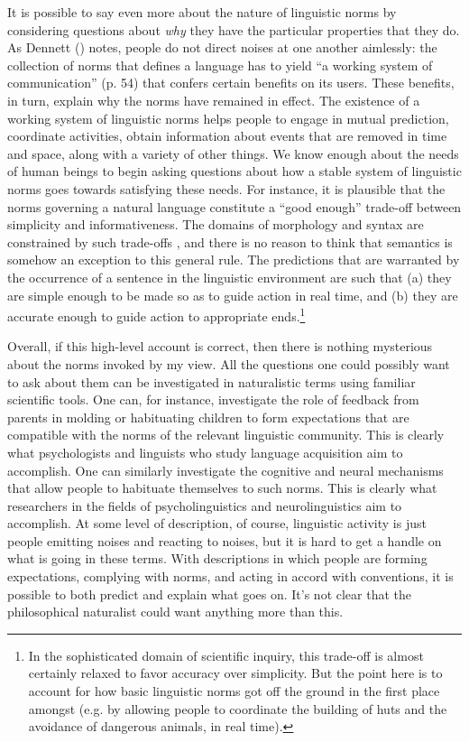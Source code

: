 It is possible to say even more about the nature of linguistic norms by considering questions about \textit{why} they have the particular properties that they do. As Dennett (\citeyear{Dennett:2010}) notes, people do not direct noises at one another aimlessly: the collection of norms that defines a language has to yield ``a working system of communication'' (p. 54) that confers certain benefits on its users. These benefits, in turn, explain why the norms have remained in effect. The existence of a working system of linguistic norms helps people to engage in mutual prediction, coordinate activities, obtain information about events that are removed in time and space, along with a variety of other things. We know enough about the needs of human beings to begin asking questions about how a stable system of linguistic norms goes towards satisfying these needs. For instance, it is plausible that the norms governing a natural language constitute a ``good enough'' trade-off between simplicity and informativeness. The domains of morphology and syntax are constrained by such trade-offs \citep{Frank:2016}, and there is no reason to think that semantics is somehow an exception to this general rule. The predictions that are warranted by the occurrence of a sentence in the linguistic environment are such that (a) they are simple enough to be made so as to guide action in real time, and (b) they are accurate enough to guide action to appropriate ends.\footnote{In the sophisticated domain of scientific inquiry, this trade-off is almost certainly relaxed to favor accuracy over simplicity. But the point here is to account for how basic linguistic norms got off the ground in the first place amongst (e.g. by allowing people to coordinate the building of huts and the avoidance of dangerous animals, in real time).} 

Overall, if this high-level account is correct, then there is nothing mysterious about the norms invoked by my view. All the questions one could possibly want to ask about them can be investigated in naturalistic terms using familiar scientific tools. One can, for instance, investigate the role of feedback from parents in molding or habituating children to form expectations that are compatible with the norms of the relevant linguistic community. This is clearly what psychologists and linguists who study language acquisition aim to accomplish. One can similarly investigate the cognitive and neural mechanisms that allow people to habituate themselves to such norms. This is clearly what researchers in the fields of psycholinguistics and neurolinguistics aim to accomplish. At some level of description, of course, linguistic activity is just people emitting noises and reacting to noises, but it is hard to get a handle on what is going in these terms. With descriptions in which people are forming expectations, complying with norms, and acting in accord with conventions, it is possible to both predict and explain what goes on. It's not clear that the philosophical naturalist could want anything more than this. 

